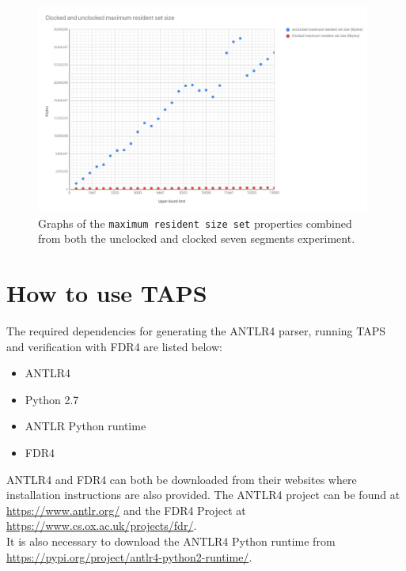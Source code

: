 \begin{figure}
    \includegraphics[width=0.98\textwidth]{./figures/temporary_graphs/combined_maximum_resident_set_size.jpg}
\caption{Graphs of the \texttt{maximum resident size set} properties combined from both the unclocked and clocked seven segments experiment.}
\label{fig:combined_resident_size}
\end{figure}







\newpage
\section{How to use TAPS}
The required dependencies for generating the ANTLR4 parser, running TAPS and verification with FDR4 are listed below:
\begin{itemize}
    \item ANTLR4
    \item Python 2.7
    \item ANTLR Python runtime
    \item FDR4
\end{itemize}

ANTLR4 and FDR4 can both be downloaded from their websites where installation instructions are also provided.
The ANTLR4 project can be found at \url{https://www.antlr.org/} and the FDR4 Project at \url{https://www.cs.ox.ac.uk/projects/fdr/}.\\
It is also necessary to download the ANTLR4 Python runtime from \url{https://pypi.org/project/antlr4-python2-runtime/}.

